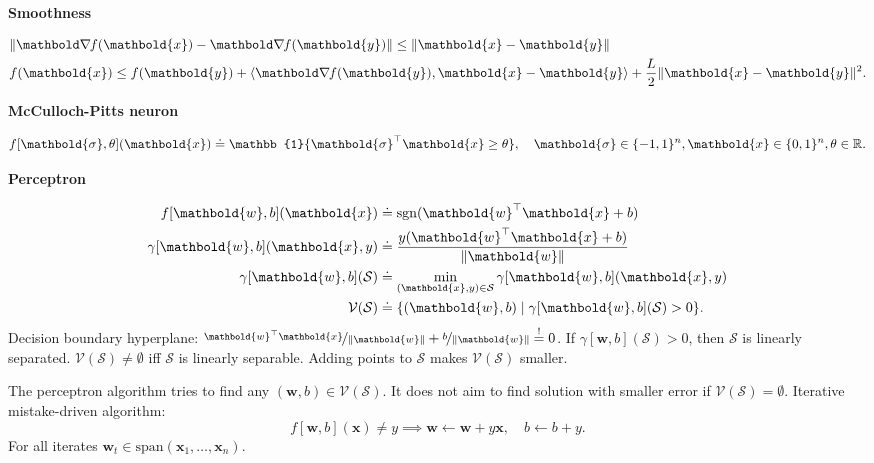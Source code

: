 \documentclass[10pt]{article}
\newenvironment{topic}[1]
{\textbf{\sffamily \footnotesize \colorbox{black}{\rlap{\textbf{\textcolor{white}{#1}}}\hspace{\linewidth}\hspace{-2\fboxsep}}}}
{}
\newenvironment{subtopic}[1]
{\vspace{0.1cm} \begin{center}\textbf{\footnotesize \sffamily #1}\end{center}}
{}
\renewcommand{\vec}[1]{\ensuremath{\mathbold{#1}}}
\begin{document}
\begin{multicols*}{3}
    \begin{subtopic}{Smoothness}
        \begin{align*}
            & \| \grad{f(\vec{x})}{} - \grad{f(\vec{y})}{} \| \leq \| \vec{x} - \vec{y} \|                                                 \\
            & f(\vec{x}) \leq f(\vec{y}) + \langle \grad{f(\vec{y})}{}, \vec{x} - \vec{y} \rangle + \frac{L}{2} \| \vec{x} - \vec{y} \|^2.
        \end{align*}
    \end{subtopic}

    \begin{topic}{Connectionism}

        \begin{subtopic}{McCulloch-Pitts neuron}
            \[
                f[\vec{\sigma},\theta](\vec{x}) \doteq \mathbb{1}\{ \transpose{\vec{\sigma}}\vec{x} \geq \theta \}, \quad \vec{\sigma} \in \{ -1,1 \}^n, \vec{x} \in \{ 0,1 \}^n, \theta \in \R.
            \]
        \end{subtopic}

        \begin{subtopic}{Perceptron}
            \begin{align*}
                f[\vec{w},b](\vec{x})          & \doteq \mathrm{sgn}(\transpose{\vec{w}}\vec{x} + b)                    \\
                \gamma[\vec{w},b](\vec{x},y)   & \doteq \frac{y (\transpose{\vec{w}}\vec{x} + b)}{\| \vec{w} \|}        \\
                \gamma[\vec{w},b](\mathcal{S}) & \doteq \min_{(\vec{x},y) \in \mathcal{S}} \gamma[\vec{w},b](\vec{x},y) \\
                \mathcal{V}(\mathcal{S})       & \doteq \{ (\vec{w},b) \mid \gamma[\vec{w},b](\mathcal{S}) > 0 \}.
            \end{align*}
            Decision boundary hyperplane: $\nicefrac{\transpose{\vec{w}} \vec{x}}{\| \vec{w} \|} + \nicefrac{b}{\| \vec{w} \|}
                \overset{!}{=} 0$. If $\gamma[\vec{w},b](\mathcal{S}) > 0$, then $\mathcal{S}$ is
            linearly separated. $\mathcal{V}(\mathcal{S}) \neq \emptyset$ iff $\mathcal{S}$ is
            linearly separable. Adding points to $\mathcal{S}$ makes $\mathcal{V}(\mathcal{S})$ smaller.

            The perceptron algorithm tries to find any $(\vec{w},b) \in \mathcal{V}(\mathcal{S})$. It does not
            aim to find solution with smaller error if $\mathcal{V}(\mathcal{S}) = \emptyset$. Iterative
            mistake-driven algorithm: \[
                f[\vec{w},b](\vec{x}) \neq y \implies \vec{w} \gets \vec{w} + y \vec{x}, \quad b \gets b + y.
            \]
            For all iterates $\vec{w}_t \in \mathrm{span}(\vec{x}_1, \ldots, \vec{x}_n)$.


\end{subtopic}
\end{topic}
\end{multicols*}
\end{document}
